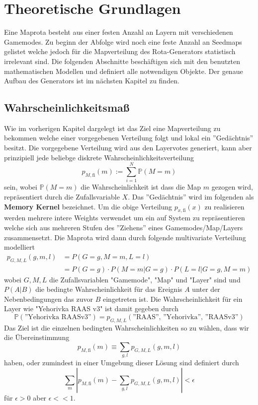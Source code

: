 \section{Theoretische Grundlagen}
    Eine Maprota besteht aus einer festen Anzahl an Layern mit verschiedenen Gamemodes. 
    Zu beginn der Abfolge wird noch eine feste Anzahl an Seedmaps gelistet welche jedoch für die Mapverteilung des Rota-Generators statistisch irrelevant sind.
    Die folgenden Abschnitte beschäftigen sich mit den benutzten mathematischen Modellen und definiert alle notwendigen Objekte.
    Der genaue Aufbau des Generators ist im nächsten Kapitel zu finden.
    \subsection{Wahrscheinlichkeitsmaß}
        Wie im vorherigen Kapitel dargelegt ist das Ziel eine Mapverteilung zu bekommen welche einer vorgegebenen Verteilung folgt und lokal ein ''Gedächtnis'' besitzt.
        Die vorgegebene Verteilung wird aus den Layervotes generiert, kann aber prinzipiell jede beliebge diskrete Wahrscheinlichkeitsverteilung 
        \begin{equation}
            p_{M,\text{fi}}(m) := \sum_{i=1}^N \mathbb{P}(M=m)
        \end{equation}
        sein, wobei $\mathbb{P}(M=m)$ die Wahrscheinlichkeit ist dass die Map $m$ gezogen wird, repräsentiert durch die Zufallsvariable $X$.
        Das ''Gedächtnis'' wird im folgenden als \textbf{Memory Kernel} bezeichnet.
        Um die obige Verteilung $p_{x,\text{fi}}(x)$ zu realisieren werden mehrere intere Weights verwendet um ein auf System zu repräsentieren welche sich aus mehreren Stufen des ''Ziehens'' eines Gamemodes/Map/Layers zusammensetzt.
        Die Maprota wird dann durch folgende multivariate Verteilung modelliert
        \begin{align}
            p_{G,M,L}(g,m,l)    &= P(G=g, M=m, L=l) \\
                                &= P(G=g)\cdot P(M=m|G=g) \cdot P(L=l|G=g, M=m)
        \end{align}
        wobei $G,M,L$ die Zufallsvariablen "Gamemode", "Map" und "Layer" sind und $P(A|B)$ die bedingte Wahrscheinlichkeit für das Ereignis $A$ unter der Nebenbedingungen das zuvor $B$ eingetreten ist.
        Die Wahrscheinlichkeit für ein Layer wie "Yehorivka RAAS v3" ist damit gegeben durch 
        \begin{equation*}
            \mathbb{P}(\text{''Yehorivka RAASv3''}) = p_{G,M,L}(\text{''RAAS'', ''Yehorivka'', ''RAASv3''})
        \end{equation*}
        Das Ziel ist die einzelnen bedingten Wahrscheinlichkeiten so zu wählen, dass wir die Übereinstimmung
        \begin{equation}
            p_{M,\text{fi}}(m) \equiv \sum_{g,l}p_{G,M,L}(g,m,l)
        \end{equation}
        haben, oder zumindest in einer Umgebung dieser Lösung sind definiert durch 
        \begin{equation}
            \sum_m |p_{M,\text{fi}}(m)-\sum_{g,l}p_{G,M,L}(g,m,l)|<\epsilon  
        \end{equation}
        für $\epsilon>0$ aber $\epsilon << 1$.
